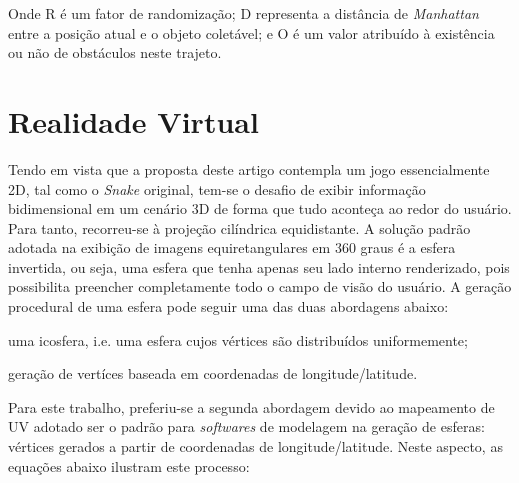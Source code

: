 \documentclass[conference]{IEEEtran}
\begin{document}
Onde R é um fator de randomização; D representa a distância de \textit{Manhattan} entre a posição atual e o objeto coletável; e O é um valor atribuído à existência ou não de obstáculos neste trajeto.

\section{Realidade Virtual} \label{sec:invertedsphere}
Tendo em vista que a proposta deste artigo contempla um jogo essencialmente 2D, tal como o \textit{Snake} original, tem-se o desafio de exibir informação bidimensional em um cenário 3D de forma que tudo aconteça ao redor do usuário. Para tanto, recorreu-se à projeção cilíndrica equidistante. A solução padrão adotada na exibição de imagens equiretangulares em 360 graus é a esfera invertida, ou seja, uma esfera que tenha apenas seu lado interno renderizado, pois possibilita preencher completamente todo o campo de visão do usuário. A geração procedural de uma esfera pode seguir uma das duas abordagens abaixo:
\begin{enumerate}
  \begin{item} uma icosfera, i.e. uma esfera cujos vértices são distribuídos uniformemente; \end{item}
  \begin{item} geração de vertíces baseada em coordenadas de longitude/latitude. \end{item}
\end{enumerate}

Para este trabalho, preferiu-se a segunda abordagem devido ao mapeamento de UV adotado ser o padrão para \textit{softwares} de modelagem na geração de esferas: vértices gerados a partir de coordenadas de longitude/latitude. Neste aspecto, as equações abaixo ilustram este processo:

\end{document}
